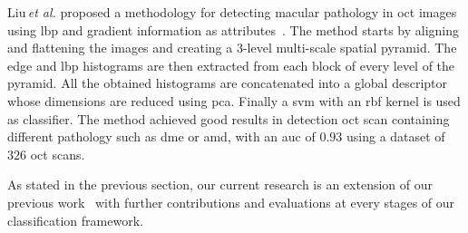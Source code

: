 Liu\,\textit{et al.} proposed a methodology for detecting macular pathology in \gls{oct} images using \gls{lbp} and gradient information as attributes~\cite{Liu2011}.
The method starts by aligning and flattening the images and creating a $3$-level multi-scale spatial pyramid.
The edge and \gls{lbp} histograms are then extracted from each block of every level of the pyramid.
All the obtained histograms are concatenated into a global descriptor whose dimensions are reduced using \gls{pca}.
Finally a \gls{svm} with an \gls{rbf} kernel is used as classifier.
The method achieved good results in detection \gls{oct} scan containing different pathology such as \gls{dme} or \gls{amd}, with an \gls{auc} of $0.93$ using a dataset of $326$ \gls{oct} scans.


As stated in the previous section, our current research is an extension of our previous work~\cite{Lemaitre2015} with further contributions and evaluations at every stages of our classification framework.

%  



